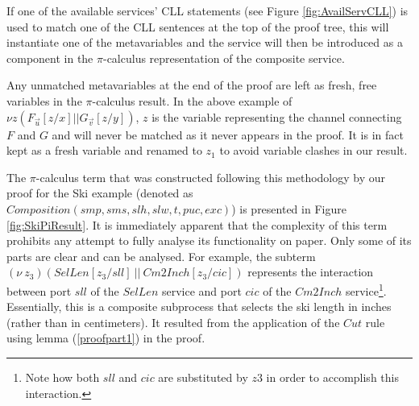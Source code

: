 \documentclass[copyright,creativecommons]{eptcs}
\begin{document}
If one of the available services' CLL statements (see Figure \ref{fig:AvailServCLL}) is used to match one of the CLL sentences at the top of the proof tree, this will instantiate one of the metavariables and the service will then be introduced as a component in the $\pi$-calculus representation of the composite service.

Any unmatched metavariables at the end of the proof are left as fresh, free variables in the $\pi$-calculus result. In the above example of $\nu z (F_{\vec{u}}[z/x] || G_{\vec{v}}[z/y])$, $z$ is the variable representing the channel connecting $F$ and $G$ and will never be matched as it never appears in the proof. It is in fact kept as a fresh variable and renamed to $z_1$ to avoid variable clashes in our result.

The $\pi$-calculus term that was constructed following this methodology by our proof for the Ski example (denoted as $Composition(smp,sms,slh,slw,t,puc,exc)$) is presented in Figure \ref{fig:SkiPiResult}. It is immediately apparent that the complexity of this term prohibits any attempt to fully analyse its functionality on paper. Only some of its parts are clear and can be analysed. For example, the subterm $(\nu\ z_3)(SelLen[z_3/sll]\ ||\ Cm2Inch[z_3/cic])$ represents the interaction between port $sll$ of the $SelLen$ service and port $cic$ of the $Cm2Inch$ service\footnote{Note how both $sll$ and $cic$ are substituted by $z3$ in order to accomplish this interaction.}. Essentially, this is a composite subprocess that selects the ski length in inches (rather than in centimeters). It resulted from the application of the $Cut$ rule using lemma (\ref{proofpart1}) in the proof.
\end{document}
